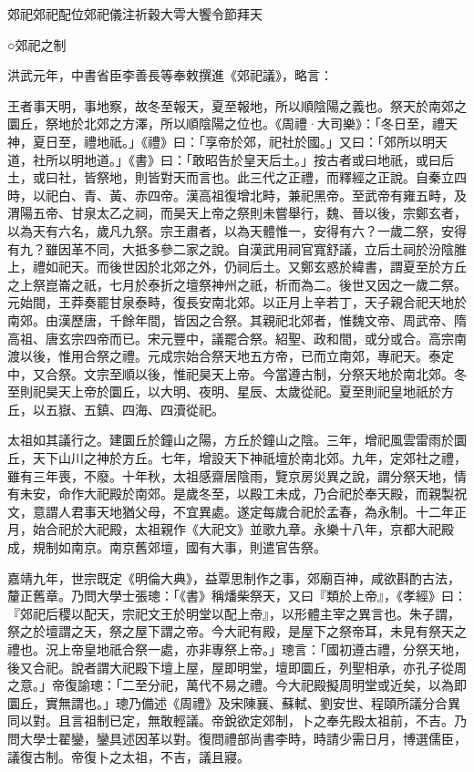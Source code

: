 郊祀郊祀配位郊祀儀注祈穀大雩大饗令節拜天

○郊祀之制

洪武元年，中書省臣李善長等奉敕撰進《郊祀議》，略言：

王者事天明，事地察，故冬至報天，夏至報地，所以順陰陽之義也。祭天於南郊之圜丘，祭地於北郊之方澤，所以順陰陽之位也。《周禮·大司樂》：「冬日至，禮天神，夏日至，禮地祇。」《禮》曰：「享帝於郊，祀社於國。」又曰：「郊所以明天道，社所以明地道。」《書》曰：「敢昭告於皇天后土。」按古者或曰地祇，或曰后土，或曰社，皆祭地，則皆對天而言也。此三代之正禮，而釋經之正說。自秦立四時，以祀白、青、黃、赤四帝。漢高祖復增北畤，兼祀黑帝。至武帝有雍五畤，及渭陽五帝、甘泉太乙之祠，而昊天上帝之祭則未嘗舉行，魏、晉以後，宗鄭玄者，以為天有六名，歲凡九祭。宗王肅者，以為天體惟一，安得有六？一歲二祭，安得有九？雖因革不同，大抵多參二家之說。自漢武用祠官寬舒議，立后土祠於汾陰脽上，禮如祀天。而後世因於北郊之外，仍祠后土。又鄭玄惑於緯書，謂夏至於方丘之上祭崑崙之祇，七月於泰折之壇祭神州之祇，析而為二。後世又因之一歲二祭。元始間，王莽奏罷甘泉泰畤，復長安南北郊。以正月上辛若丁，天子親合祀天地於南郊。由漢歷唐，千餘年間，皆因之合祭。其親祀北郊者，惟魏文帝、周武帝、隋高祖、唐玄宗四帝而已。宋元豐中，議罷合祭。紹聖、政和間，或分或合。高宗南渡以後，惟用合祭之禮。元成宗始合祭天地五方帝，已而立南郊，專祀天。泰定中，又合祭。文宗至順以後，惟祀昊天上帝。今當遵古制，分祭天地於南北郊。冬至則祀昊天上帝於圜丘，以大明、夜明、星辰、太歲從祀。夏至則祀皇地祇於方丘，以五嶽、五鎮、四海、四瀆從祀。

太祖如其議行之。建圜丘於鐘山之陽，方丘於鐘山之陰。三年，增祀風雲雷雨於圜丘，天下山川之神於方丘。七年，增設天下神祇壇於南北郊。九年，定郊社之禮，雖有三年喪，不廢。十年秋，太祖感齋居陰雨，覽京房災異之說，謂分祭天地，情有未安，命作大祀殿於南郊。是歲冬至，以殿工未成，乃合祀於奉天殿，而親製祝文，意謂人君事天地猶父母，不宜異處。遂定每歲合祀於孟春，為永制。十二年正月，始合祀於大祀殿，太祖親作《大祀文》並歌九章。永樂十八年，京都大祀殿成，規制如南京。南京舊郊壇，國有大事，則遣官告祭。

嘉靖九年，世宗既定《明倫大典》，益覃思制作之事，郊廟百神，咸欲斟酌古法，釐正舊章。乃問大學士張璁：「《書》稱燔柴祭天，又曰『類於上帝』，《孝經》曰：『郊祀后稷以配天，宗祀文王於明堂以配上帝』，以形體主宰之異言也。朱子謂，祭之於壇謂之天，祭之屋下謂之帝。今大祀有殿，是屋下之祭帝耳，未見有祭天之禮也。況上帝皇地祇合祭一處，亦非專祭上帝。」璁言：「國初遵古禮，分祭天地，後又合祀。說者謂大祀殿下壇上屋，屋即明堂，壇即圜丘，列聖相承，亦孔子從周之意。」帝復諭璁：「二至分祀，萬代不易之禮。今大祀殿擬周明堂或近矣，以為即圜丘，實無謂也。」璁乃備述《周禮》及宋陳襄、蘇軾、劉安世、程頤所議分合異同以對。且言祖制已定，無敢輕議。帝銳欲定郊制，卜之奉先殿太祖前，不吉。乃問大學士翟鑾，鑾具述因革以對。復問禮部尚書李時，時請少需日月，博選儒臣，議復古制。帝復卜之太祖，不吉，議且寢。

